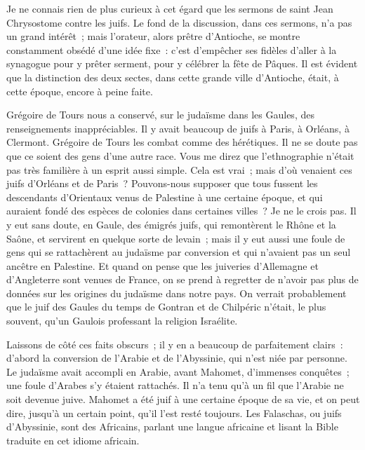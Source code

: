 \documentclass[french,twoside]{book} %
\newcommand\orgName[1]{#1}
\newcommand\persName[1]{#1}
\newcommand\placeName[1]{#1}
\begin{document}
Je ne connais rien de plus curieux à cet égard que les sermons de {\persName saint Jean Chrysostome} contre les {\orgName juifs}. Le fond de la discussion, dans ces sermons, n’a pas un grand intérêt ; mais l’orateur, alors prêtre d’{\placeName Antioche}, se montre constamment obsédé d’une idée fixe : c’est d’empêcher ses fidèles d’aller à la synagogue pour y prêter serment, pour y célébrer la fête de Pâques. Il est évident que la distinction des deux sectes, dans cette grande ville d’{\placeName Antioche}, était, à cette époque, encore à peine faite.\par
{\persName Grégoire de Tours} nous a conservé, sur le judaïsme dans les {\placeName Gaules}, des renseignements inappréciables. Il y avait beaucoup de juifs à {\placeName Paris}, à {\placeName Orléans}, à {\placeName Clermont}. {\persName Grégoire de Tours} les combat comme des hérétiques. Il ne se doute pas que ce soient des gens d’une autre race. Vous me direz que l’ethnographie n’était pas très familière à un esprit aussi simple. Cela est vrai ; mais d’où venaient ces juifs d’{\placeName Orléans} et de {\placeName Paris} ? Pouvons-nous supposer que tous fussent les descendants d’Orientaux venus de {\placeName Palestine} à une certaine époque, et qui auraient fondé des espèces de colonies dans certaines villes ? Je ne le crois pas. Il y eut sans doute, en {\placeName Gaule}, des émigrés juifs, qui remontèrent le {\placeName Rhône} et la {\placeName Saône}, et servirent en quelque sorte de levain ; mais il y eut aussi une foule de gens qui se rattachèrent au judaïsme par conversion et qui n’avaient pas un seul ancêtre en {\placeName Palestine}. Et quand on pense que les juiveries d’{\placeName Allemagne} et d’{\placeName Angleterre} sont venues de {\placeName France}, on se prend à regretter de n’avoir pas plus de données sur les origines du judaïsme dans notre pays. On verrait probablement que le juif des {\placeName Gaules} du temps de {\persName Gontran} et de {\persName Chilpéric} n’était, le plus souvent, qu’un Gaulois professant la religion Israélite.\par
Laissons de côté ces faits obscurs ; il y en a beaucoup de parfaitement clairs : d’abord la conversion de l’{\orgName Arabie} et de l’{\orgName Abyssinie}, qui n’est niée par personne. Le judaïsme avait accompli en {\placeName Arabie}, avant {\persName Mahomet}, d’immenses conquêtes ; une foule d’{\orgName Arabes} s’y étaient rattachés. Il n’a tenu qu’à un fil que l’{\orgName Arabie} ne soit devenue juive. {\persName Mahomet} a été juif à une certaine époque de sa vie, et on peut dire, jusqu’à un certain point, qu’il l’est resté toujours. Les {\orgName Falaschas}, ou {\orgName juifs d’Abyssinie}, sont des {\orgName Africains}, parlant une langue africaine et lisant la Bible traduite en cet idiome africain.\par
\end{document}
